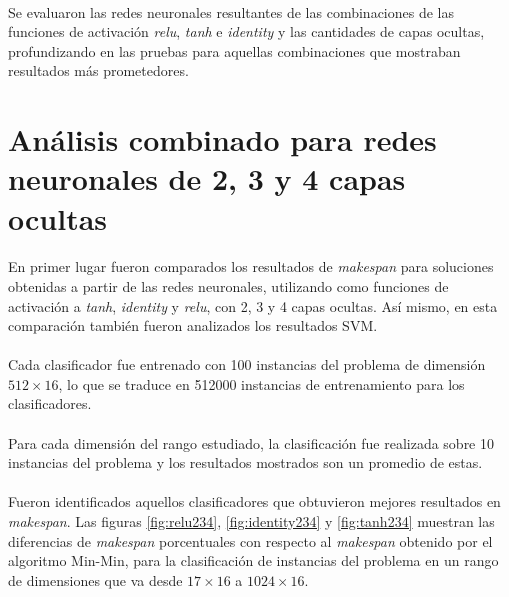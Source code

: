 \paragraph{}  Se evaluaron las redes neuronales resultantes de las combinaciones de las funciones de activación \textit{relu}, \textit{tanh} e \textit{identity} y las cantidades de capas ocultas, profundizando en las pruebas para aquellas combinaciones que mostraban resultados más prometedores.

\section{Análisis combinado para redes neuronales de 2, 3 y 4 capas ocultas}

\paragraph{}En primer lugar fueron comparados los resultados de \textit{makespan} para soluciones obtenidas a partir de las redes neuronales, utilizando como funciones de activación a \textit{tanh}, \textit{identity} y \textit{relu}, con 2, 3 y 4 capas ocultas. Así mismo, en esta comparación también fueron analizados los resultados SVM. 

\paragraph{} Cada clasificador fue entrenado con 100 instancias del problema de dimensión $512\times16$, lo que se traduce en 512000 instancias de entrenamiento para los clasificadores. 

\paragraph{} Para cada dimensión del rango estudiado, la clasificación fue realizada sobre 10 instancias del problema y los resultados mostrados son un promedio de estas.

\paragraph{} Fueron identificados aquellos clasificadores que obtuvieron mejores resultados en \textit{makespan}. Las figuras \ref{fig:relu234}, \ref{fig:identity234} y \ref{fig:tanh234} muestran las diferencias de \textit{makespan} porcentuales con respecto al \textit{makespan} obtenido por el algoritmo Min-Min, para la clasificación de instancias del problema en un rango de dimensiones que va desde $17\times16$ a $1024\times16$.

